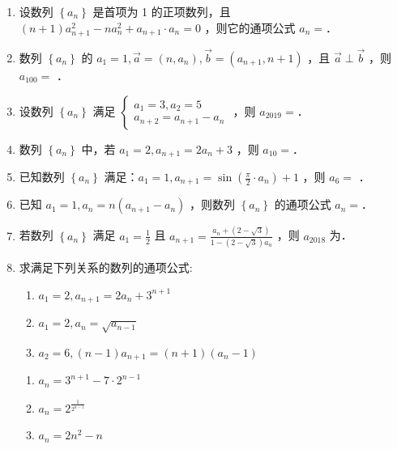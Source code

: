 \begin{enumerate}
    \item 设数列 $\left\{a_n\right\}$ 是首项为 1 的正项数列，且 $(n+1) a_{n+1}^2-n a_n^2+a_{n+1} \cdot a_n=0$ ，则它的通项公式 $a_n=$．

    \item 数列 $\left\{a_n\right\}$ 的 $a_1=1, \vec{a}=\left(n, a_n\right), \vec{b}=\left(a_{n+1}, n+1\right)$ ，且 $\vec{a} \perp \vec{b}$ ，则 $a_{100}=$ ．

    \item 设数列 $\left\{a_n\right\}$ 满足 $\left\{\begin{array}{l}a_1=3, a_2=5 \\ a_{n+2}=a_{n+1}-a_n\end{array}\right.$ ，则 $a_{2019}=$．

    \item 数列 $\left\{a_n\right\}$ 中，若 $a_1=2, a_{n+1}=2 a_n+3$ ，则 $a_{10}=$．

    \item 已知数列 $\left\{a_n\right\}$ 满足：$a_1=1, a_{n+1}=\sin \left(\frac{\pi}{2} \cdot a_n\right)+1$ ，则 $a_6=$ ．

    \item 已知 $a_1=1, a_n=n\left(a_{n+1}-a_n\right)$ ，则数列 $\left\{a_n\right\}$ 的通项公式 $a_n=$．

    \item 若数列 $\left\{a_n\right\}$ 满足 $a_1=\frac{1}{2}$ 且 $a_{n+1}=\frac{a_n+(2-\sqrt{3})}{1-(2-\sqrt{3}) a_n}$ ，则 $a_{2018}$ 为．

    \item 求满足下列关系的数列的通项公式:
    \begin{enumerate}
        \item ${a}_{1} = 2,{a}_{n + 1} = 2{a}_{n} + {3}^{n + 1}$
        \item ${a}_{1} = 2,{a}_{n} = \sqrt{{a}_{n - 1}}$
        \item ${a}_{2} = 6,\left( {n - 1}\right) {a}_{n + 1} = \left( {n + 1}\right) \left( {{a}_{n} - 1}\right)$
    \end{enumerate}
    \begin{jieda}
        \begin{enumerate}
            \item $a_n = 3^{n+1}-7\cdot2^{n-1}$
            \item $a_n = 2^\frac{1}{{2^{n-1}}}$
            \item $a_n = 2n^2-n$
        \end{enumerate}
    \end{jieda}
    

\end{enumerate}
